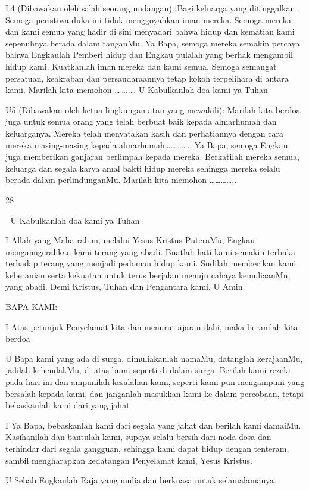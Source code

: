 \documentclass[10pt,a5paper,fancyhdr]{memoir}
\begin{document}
L4 (Dibawakan oleh salah seorang undangan): Bagi keluarga yang 
ditinggalkan. Semoga peristiwa duka ini tidak menggoyahkan iman 
mereka. Semoga mereka dan kami semua yang hadir di sini 
menyadari bahwa hidup dan kematian kami sepenuhnya berada 
dalam tanganMu. Ya Bapa, semoga mereka semakin percaya bahwa 
Engkaulah Pemberi hidup dan Engkau pulalah yang berhak 
mengambil hidup kami. Kuatkanlah iman mereka dan kami semua. 
Semoga semangat persatuan, keakraban dan persaudaraannya tetap 
kokoh terpelihara di antara kami. Marilah kita memohon ……..… 
U Kabulkanlah doa kami ya Tuhan 

U5 (Dibawakan oleh ketua lingkungan atau yang mewakili): Marilah 
kita berdoa juga untuk semua orang yang telah berbuat baik kepada 
almarhumah dan keluarganya. Mereka telah menyatakan kasih dan 
perhatiannya dengan cara mereka masing-masing kepada 
almarhumah………….. Ya Bapa, semoga Engkau juga memberikan 
ganjaran berlimpah kepada mereka. Berkatilah mereka semua, 
keluarga dan segala karya amal bakti hidup mereka sehingga mereka 
selalu berada dalam perlindunganMu. Marilah kita memohon 
………….. 

28 



U Kabulkanlah doa kami ya Tuhan 


I Allah yang Maha rahim, melalui Yesus Kristus PuteraMu, 
Engkau menganugerahkan kami terang yang abadi. Buatlah hati kami 
semakin terbuka terhadap terang yang menjadi pedoman hidup kami. 
Sudilah memberikan kami keberanian serta kekuatan untuk terus 
berjalan menuju cahaya kemuliaanMu yang abadi. Demi Kristus, 
Tuhan dan Pengantara kami. 
U Amin 


BAPA KAMI: 


I Atas petunjuk Penyelamat kita dan menurut ajaran ilahi, maka 
beranilah kita berdoa 


U Bapa kami yang ada di surga, dimuliakanlah namaMu, datanglah 
kerajaanMu, jadilah kehendakMu, di atas bumi seperti di dalam 
surga. Berilah kami rezeki pada hari ini dan ampunilah kesalahan 
kami, seperti kami pun mengampuni yang bersalah kepada kami, dan 
janganlah masukkan kami ke dalam percobaan, tetapi bebaskanlah 
kami dari yang jahat 


I Ya Bapa, bebaskanlah kami dari segala yang jahat dan berilah 
kami damaiMu. Kasihanilah dan bantulah kami, supaya selalu bersih 
dari noda dosa dan terhindar dari segala gangguan, sehingga kami 
dapat hidup dengan tenteram, sambil mengharapkan kedatangan 
Penyelamat kami, Yesus Kristus. 


U Sebab Engkaulah Raja yang mulia dan berkuasa untuk selamalamanya. 
\end{document}
